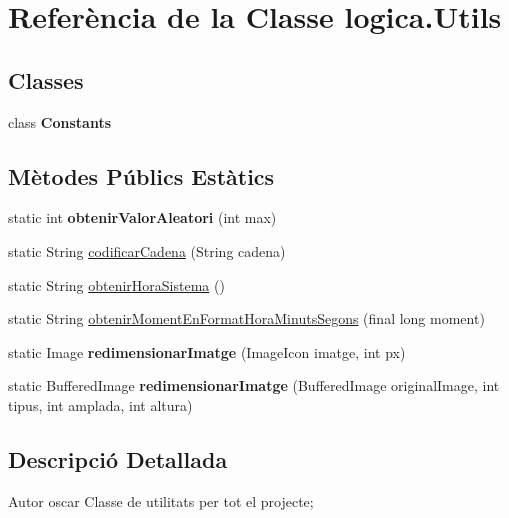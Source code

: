 \hypertarget{classlogica_1_1_utils}{\section{Referència de la Classe logica.\+Utils}
\label{classlogica_1_1_utils}
}
\subsection*{Classes}
\begin{DoxyCompactItemize}
\item 
class {\bfseries Constants}
\end{DoxyCompactItemize}
\subsection*{Mètodes Públics Estàtics}
\begin{DoxyCompactItemize}
\item 
\hypertarget{classlogica_1_1_utils_a9b70eb7cd5d0abf2938c68baa3034894}{static int {\bfseries obtenir\+Valor\+Aleatori} (int max)}\label{classlogica_1_1_utils_a9b70eb7cd5d0abf2938c68baa3034894}

\item 
static String \hyperlink{classlogica_1_1_utils_a66b968a61334d9723942ad3a9e621fbd}{codificar\+Cadena} (String cadena)
\item 
static String \hyperlink{classlogica_1_1_utils_aaf9d9b176acc66d9c2e9ba977a22f414}{obtenir\+Hora\+Sistema} ()
\item 
static String \hyperlink{classlogica_1_1_utils_a621092fb3c75d5fc727ed3708ee00f24}{obtenir\+Moment\+En\+Format\+Hora\+Minuts\+Segons} (final long moment)
\item 
\hypertarget{classlogica_1_1_utils_a5c0e404e667ec5f7fdac6a244b224098}{static Image {\bfseries redimensionar\+Imatge} (Image\+Icon imatge, int px)}\label{classlogica_1_1_utils_a5c0e404e667ec5f7fdac6a244b224098}

\item 
\hypertarget{classlogica_1_1_utils_aaf930ea3e64076e1058757013226f044}{static Buffered\+Image {\bfseries redimensionar\+Imatge} (Buffered\+Image original\+Image, int tipus, int amplada, int altura)}\label{classlogica_1_1_utils_aaf930ea3e64076e1058757013226f044}

\end{DoxyCompactItemize}


\subsection{Descripció Detallada}
\begin{DoxyAuthor}{Autor}
oscar Classe de utilitats per tot el projecte; 
\end{DoxyAuthor}


